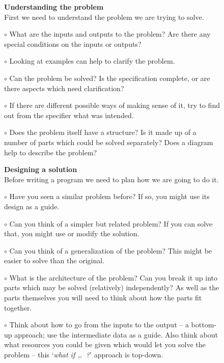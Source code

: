 \newcommand{\itemstart}{\smallskip\noindent$\circ$\hspace*{3mm}}
\begin{figure}

{\sc \textbf{Understanding the problem}}\hspace*{1mm}\hrulefill\\

First we need to understand the problem we are trying to solve. 

\itemstart
What are the inputs and outputs to the problem? Are there any special
conditions on the inputs or outputs?

\itemstart
Looking at examples can help to clarify the problem.

\itemstart
Can the problem be solved? Is the specification complete, or are there
aspects which need clarification?

\itemstart
If there are different possible ways of making sense of it, try to find
out from the specifier what was intended.

\itemstart
Does the problem itself have a structure? Is it made up of a number of
parts which could be solved separately? Does a diagram help to describe
the problem?

\bigskip
\noindent
{\sc \textbf{Designing a solution}}\hspace*{1mm}\hrulefill\\

\noindent
Before writing a program we need to plan how we are going to do it.

\itemstart
Have you seen a similar problem before? If so, you might use its design
as a guide. 

\itemstart
Can you think of a simpler but related problem? If you can solve that,
you might use or modify the solution.

\itemstart
Can you think of a generalization of the problem? This might be easier
to solve than the original.

\itemstart
What is the architecture of the problem? Can you break it up into parts
which may be solved (relatively) independently? As well as the parts themselves
you will need to think about how the parts fit together.

\itemstart
Think about how to go from the inputs to the output -- a bottom-up
approach; use the intermediate data as a guide. Also think about what resources you could be
given which would let you solve the problem -- this `{\em what if \ldots\ ?}' approach
is top-down.


\end{figure}
